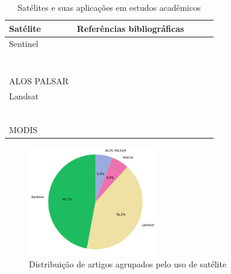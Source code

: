 \begin{table}[h]
 \captionsetup{width=0.83\textwidth}
 \centering
 \caption{Satélites e suas aplicações em estudos acadêmicos}\label{tab:satelites}
\begin{tabular}{p{6cm} cccc}
\toprule
\textbf{Satélite} & \textbf{Referências bibliográficas} \\
\midrule
Sentinel 
  & \cite{wegner_2024} \\
  & \cite{vantiel2024multiscalemultimodalspeciesdistribution} \\
  & \cite{chen_peng_li_chen} \\
  & \cite{murray_2024} \\
  & \cite{picek:2024} \\
  & \cite{Oliveira_Bernardino_Vieira_Augusto_2025} \\
  & \cite{DeGiorgi2025} \\
  & \cite{Spondylidis_Giannoulaki_Machias_Batzakas_Topouzelis_2024} \\
\midrule
ALOS PALSAR 
  & \cite{Crispim-Mendes_Valerio_Marques_Pita_Godinho_Silva_2024} \\
\midrule
Landsat 
  & \cite{Picek_Botella_Servajean_Leblanc_Palard_Larcher_Deneu_Marcos_Bonnet_Joly_2024} \\
  & \cite{Crego:2024} \\
  & \cite{chen_peng_li_chen} \\
  & \cite{Gupta_Zuquim_Tuomisto_2024} \\
  & \cite{Giachello_Lefosse_Simoncini_Bonato_2025} \\
  & \cite{Cupiche-Herrera_Westwood_McLaren_2024} \\
  & \cite{Jefferys:2024} \\
\midrule
MODIS 
  & \cite{Abadijoo2025} \\
\bottomrule
\end{tabular}
\end{table}

 \begin{figure}[!htb]
     \caption{Distribuição de artigos agrupados pelo uso de satélite}
     \label{fig:satelites}
     \includegraphics[width=0.5\textwidth]{figuras/Trabalhos Correlatos/satelites.png}
 \end{figure}

